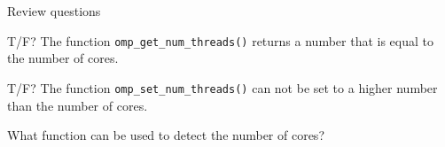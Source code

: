  {Review questions}

\begin{exercise}
  T/F?
  The function \lstinline+omp_get_num_threads()+
  returns a number that is equal to the number of cores.
\end{exercise}

\begin{exercise}
  T/F?
  The function \lstinline+omp_set_num_threads()+
  can not be set to a higher number than the number of cores.
\end{exercise}

\begin{exercise}
  What function can be used to detect the number of cores? 
\end{exercise}
